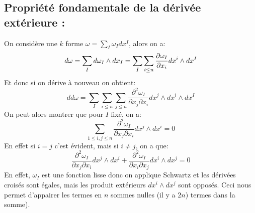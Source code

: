    \subsection*{Propriété fondamentale de la dérivée extérieure {:}}
   On considère une \( k \) forme \( \omega = \sum_I \omega_I dx^I\), alors on a:
   \[ 
      d\omega = \sum_I d\omega_I \wedge dx_I = \sum_I \sum_{i \leq n} \frac{\partial \omega_I}{\partial x_i}dx^i \wedge dx^I
   \]
   Et donc si on dérive à nouveau on obtient:
   \[ 
      dd\omega =  \sum_I \sum_{i \leq n} \sum_{j \leq n} \frac{\partial^2 \omega_I}{\partial x_j \partial x_i} dx^j \wedge dx^i \wedge dx^I
   \]
   On peut alors montrer que pour \( I \) fixé, on a:
   \[ 
      \sum_{1 \leq i, j\leq n} \frac{\partial^2 \omega_I}{\partial x_j \partial x_i} dx^j \wedge dx^i = 0
   \]
   En effet si \( i = j \) c'est évident, mais si \( i \neq j \), on a que:
   \[ 
      \frac{\partial^2 \omega_I}{\partial x_j \partial x_i} dx^j \wedge dx^i + \frac{\partial^2 \omega_I}{\partial x_i \partial x_j} dx^i \wedge dx^j = 0
   \]
   En effet, \( \omega_I \) est une fonction lisse donc on applique Schwartz et les dérivées croisés sont égales, mais les produit extérieurs \( dx^i \wedge dx^j \) sont opposés. Ceci nous permet d'appairer les termes en \( n \) sommes nulles (il y a \( 2n \)) termes dans la somme).
 